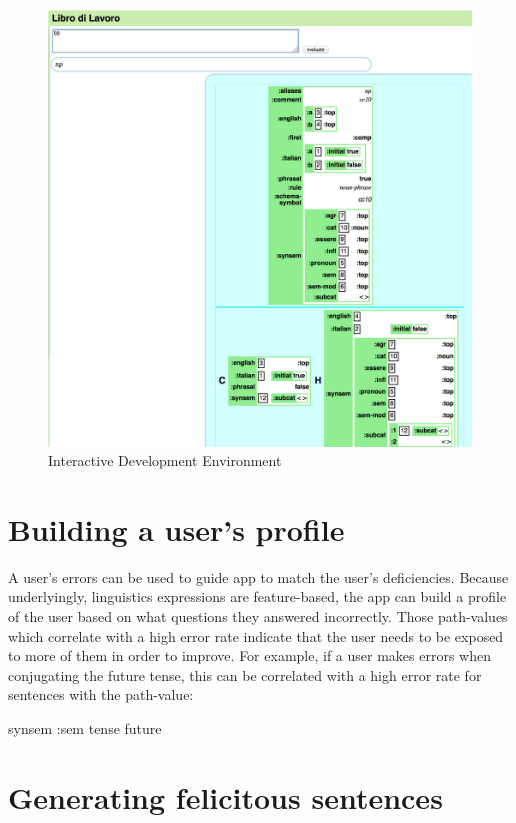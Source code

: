 \documentclass[11pt]{article}
\begin{document}
\begin{figure}[H]
  \includegraphics[scale=0.20]{np}
  \caption{Interactive Development Environment}
\end{figure}

\section{Building a user's profile}

A user's errors can be used to guide app to match the user's
deficiencies. Because underlyingly, linguistics expressions are
feature-based, the app can build a profile of the user based on what
questions they answered incorrectly. Those path-values which
correlate with a high error rate indicate that the user needs to be
exposed to more of them in order to improve. For example, if a user
makes errors when conjugating the future tense, this can be correlated
with a high error rate for sentences with the path-value:

   {synsem {:sem {tense future}}}
 
\section{Generating felicitous sentences}
\end{document}
